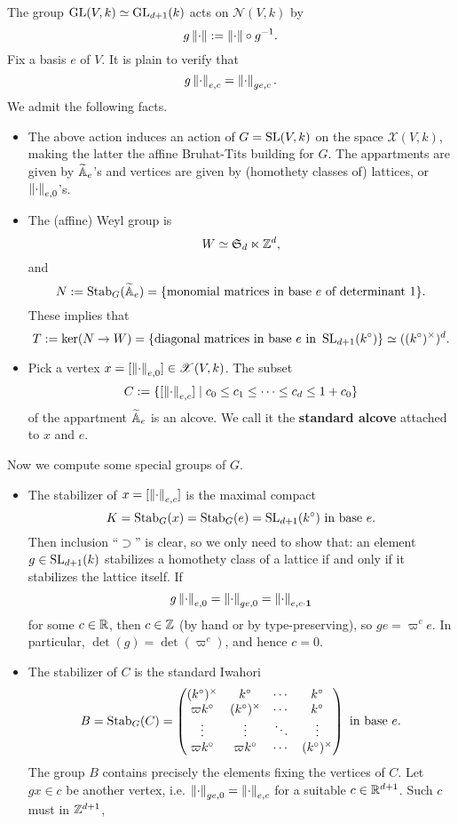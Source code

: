 \documentclass{article}
\begin{document}
The group $\operatorname{GL}(V, k)\simeq\operatorname{GL}_{d + 1}(k)$ acts on $\mathscr{N}(V, k)$ by \[g\left\| \cdot\right\| := \left\| \cdot\right\|\circ g^{-1}.\]
Fix a basis $e$ of $V$.
It is plain to verify that \[g\left\| \cdot\right\|_{e, c} = \left\| \cdot\right\|_{ge, c}.\]
We admit the following facts. \begin{itemize}
    \item The above action induces an action of $G = \operatorname{SL}(V, k)$ on the space $\mathscr{X}(V, k)$, making the latter the affine Bruhat-Tits building for $G$. The appartments are given by $\widetilde{\mathbb{A}}_e$'s and vertices are given by (homothety classes of) lattices, or $\left\| \cdot\right\|_{e, 0}$'s.
    \item The (affine) Weyl group is
    \[W \simeq \mathfrak{S}_d\ltimes \mathbb{Z}^d,\] and \[N := \operatorname{Stab}_{G}(\widetilde{\mathbb{A}}_e) = \{\text{monomial matrices in base }e\text{ of determinant 1}\}.\]
    These implies that \[T := \ker(N\to W) =\{\text{diagonal matrices in base }e\text{ in }\operatorname{SL}_{d + 1}(k^\circ)\}\simeq ((k^\circ)^\times)^d.\]
    \item Pick a vertex $x = [\left\| \cdot\right\|_{e, 0}]\in\mathscr{X}(V, k)$. The subset \[C := \{[\left\| \cdot\right\|_{e, c}]\mid c_0\le c_1\le\dots\le c_d\le 1 + c_0\}\] of the appartment $\widetilde{\mathbb{A}}_e$ is an alcove. We call it the \textbf{standard alcove} attached to $x$ and $e$.
\end{itemize}
Now we compute some special groups of $G$.
\begin{itemize}
    \item The stabilizer of $x = [\left\| \cdot\right\|_{e, c}]$ is the maximal compact \[K = \operatorname{Stab}_G(x) = \operatorname{Stab}_G(e) = \operatorname{SL}_{d+1}(k^\circ)\text{ in base }e.\]
    Then inclusion ``$\supset$'' is clear, so we only need to show that: an element $g\in\operatorname{SL}_{d+1}(k)$ stabilizes a homothety class of a lattice if and only if it stabilizes the lattice itself.
    If \[g\left\| \cdot\right\|_{e, 0} = \left\| \cdot\right\|_{ge, 0} = \left\| \cdot\right\|_{e, c\cdot\mathbf{1}}\]for some $c\in\mathbb{R}$, then $c\in\mathbb{Z}$ (by hand or by type-preserving), so $ge = \varpi^ce$.
    In particular, $\det(g) = \det(\varpi^c)$,
    and hence $c = 0$. 
    \item The stabilizer of $C$ is the standard Iwahori
    \[B = \operatorname{Stab}_{G}(C) = \begin{pmatrix}
        (k^\circ)^\times & k^\circ & \cdots & k^\circ\\
        \varpi k^\circ & (k^\circ)^\times & \cdots & k^\circ\\
        \vdots & \vdots & \ddots & \vdots\\
        \varpi k^\circ & \varpi k^\circ & \cdots & (k^\circ)^\times
    \end{pmatrix}\text{ in base }e.\]
    The group $B$ contains precisely the elements fixing the vertices of $C$.
    Let $gx\in c$ be another vertex,
    i.e. $\left\| \cdot\right\|_{ge, 0} = \left\| \cdot\right\|_{e, c}$ for a suitable $c\in\mathbb{R}^{d+1}$.
    Such $c$ must in $\mathbb{Z}^{d+1}$,
    
\end{itemize}
\end{document}
